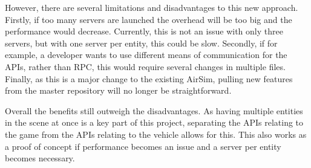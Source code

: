 However, there are several limitations and disadvantages to this new approach. Firstly, if too many servers are launched the overhead will be too big and the performance would decrease. Currently, this is not an issue with only three servers, but with one server per entity, this could be slow. Secondly, if for example, a developer wants to use different means of communication for the APIs, rather than RPC, this would require several changes in multiple files. Finally, as this is a major change to the existing AirSim, pulling new features from the master repository will no longer be straightforward. 

Overall the benefits still outweigh the disadvantages. As having multiple entities in the scene at once is a key part of this project, separating the APIs relating to the game from the APIs relating to the vehicle allows for this. This also works as a proof of concept if performance becomes an issue and a server per entity becomes necessary. 





